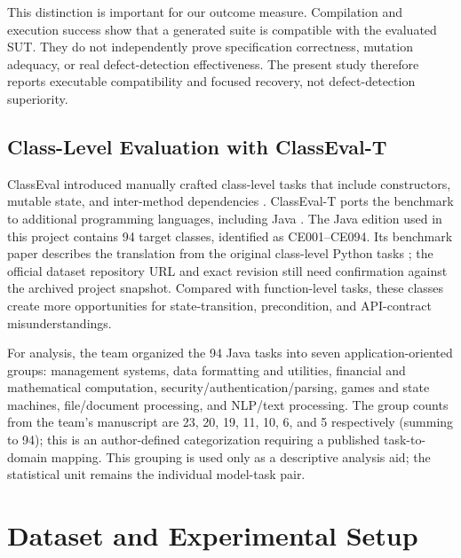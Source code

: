 \documentclass[conference]{IEEEtran}
\begin{document}
This distinction is important for our outcome measure. Compilation and execution success show that a generated suite is compatible with the evaluated SUT. They do not independently prove specification correctness, mutation adequacy, or real defect-detection effectiveness. The present study therefore reports executable compatibility and focused recovery, not defect-detection superiority.

\subsection{Class-Level Evaluation with ClassEval-T}
ClassEval introduced manually crafted class-level tasks that include constructors, mutable state, and inter-method dependencies \cite{du2024classeval}. ClassEval-T ports the benchmark to additional programming languages, including Java \cite{xue2025classevalt}. The Java edition used in this project contains 94 target classes, identified as CE001--CE094. Its benchmark paper describes the translation from the original class-level Python tasks \cite{xue2025classevalt}; the official dataset repository URL and exact revision still need confirmation against the archived project snapshot. Compared with function-level tasks, these classes create more opportunities for state-transition, precondition, and API-contract misunderstandings.

For analysis, the team organized the 94 Java tasks into seven application-oriented groups: management systems, data formatting and utilities, financial and mathematical computation, security/authentication/parsing, games and state machines, file/document processing, and NLP/text processing. The group counts from the team's manuscript are 23, 20, 19, 11, 10, 6, and 5 respectively (summing to 94); this is an author-defined categorization requiring a published task-to-domain mapping. This grouping is used only as a descriptive analysis aid; the statistical unit remains the individual model-task pair.

\section{Dataset and Experimental Setup}
\end{document}
